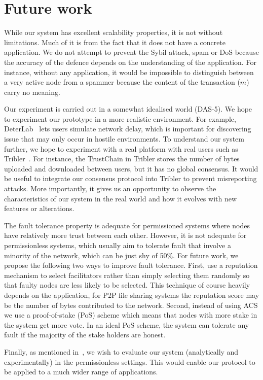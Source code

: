 \section{Future work}
While our system has excellent scalability properties, it is not without limitations.
Much of it is from the fact that it does not have a concrete application.
We do not attempt to prevent the Sybil attack, spam or DoS because the accuracy of the defence depends on the understanding of the application.
For instance, without any application, it would be impossible to distinguish between a very active node from a spammer because the content of the transaction ($m$) carry no meaning.

Our experiment is carried out in a somewhat idealised world (DAS-5).
We hope to experiment our prototype in a more realistic environment.
For example, DeterLab~\cite{mirkovic2012teaching} lets users simulate network delay,
which is important for discovering issue that may only occur in hostile environments.
To understand our system further, we hope to experiment with a real platform with real users such as Tribler~\cite{pouwelse2008tribler}.
For instance, the TrustChain in Tribler stores the number of bytes uploaded and downloaded between users, but it has no global consensus.
It would be useful to integrate our consensus protocol into Tribler to prevent misreporting attacks.
More importantly, it gives us an opportunity to observe the characteristics of our system in the real world and how it evolves with new features or alterations.

The fault tolerance property is adequate for permissioned systems where nodes have relatively more trust between each other.
However, it is not adequate for permissionless systems,
which usually aim to tolerate fault that involve a minority of the network,
which can be just shy of 50\%.
For future work, we propose the following two ways to improve fault tolerance.
First, use a reputation mechanism to select facilitators rather than simply selecting them randomly so that faulty nodes are less likely to be selected.
This technique of course heavily depends on the application,
for P2P file sharing systems the reputation score may be the number of bytes contributed to the network.
Second, instead of using ACS we use a proof-of-stake (PoS) scheme which means that nodes with more stake in the system get more vote.
In an ideal PoS scheme, the system can tolerate any fault if the majority of the stake holders are honest.

Finally, as mentioned in~, we wish to evaluate our system (analytically and experimentally) in the permissionless settings.
This would enable our protocol to be applied to a much wider range of applications.
